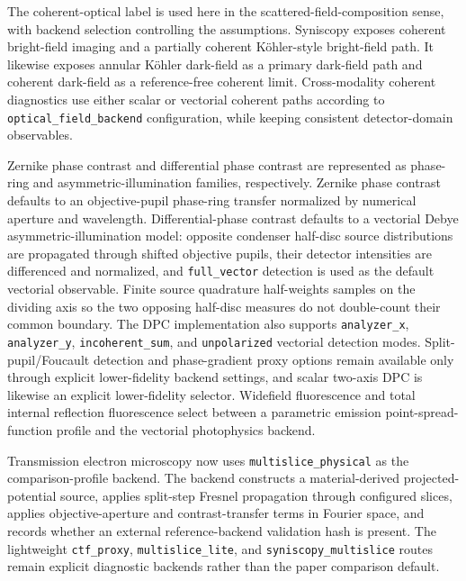 The coherent-optical label is used here in the scattered-field-composition sense, with backend selection controlling the assumptions. Syniscopy exposes coherent bright-field imaging and a partially coherent K\"{o}hler-style bright-field path. It likewise exposes annular K\"{o}hler dark-field as a primary dark-field path and coherent dark-field as a reference-free coherent limit. Cross-modality coherent diagnostics use either scalar or vectorial coherent paths according to \texttt{optical\_field\_backend} configuration, while keeping consistent detector-domain observables.

Zernike phase contrast and differential phase contrast are represented as phase-ring and asymmetric-illumination families, respectively. Zernike phase contrast defaults to an objective-pupil phase-ring transfer normalized by numerical aperture and wavelength. Differential-phase contrast defaults to a vectorial Debye asymmetric-illumination model: opposite condenser half-disc source distributions are propagated through shifted objective pupils, their detector intensities are differenced and normalized, and \texttt{full\_vector} detection is used as the default vectorial observable. Finite source quadrature half-weights samples on the dividing axis so the two opposing half-disc measures do not double-count their common boundary. The DPC implementation also supports \texttt{analyzer\_x}, \texttt{analyzer\_y}, \texttt{incoherent\_sum}, and \texttt{unpolarized} vectorial detection modes. Split-pupil/Foucault detection and phase-gradient proxy options remain available only through explicit lower-fidelity backend settings, and scalar two-axis DPC is likewise an explicit lower-fidelity selector. Widefield fluorescence and total internal reflection fluorescence select between a parametric emission point-spread-function profile and the vectorial photophysics backend.

Transmission electron microscopy now uses \texttt{multislice\_physical} as the comparison-profile backend. The backend constructs a material-derived projected-potential source, applies split-step Fresnel propagation through configured slices, applies objective-aperture and contrast-transfer terms in Fourier space, and records whether an external reference-backend validation hash is present. The lightweight \texttt{ctf\_proxy}, \texttt{multislice\_lite}, and \texttt{syniscopy\_multislice} routes remain explicit diagnostic backends rather than the paper comparison default.

